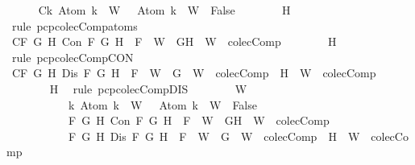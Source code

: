 \begin{isabellebody}
\ \ \ \ \isamarkupfalse%
\ C{}{\isacharcolon}{\isachardoublequoteopen}{\isasymforall}k{\isachardot}\ Atom\ k\ {\isasymin}\ W\ {\isasymlongrightarrow}\ \isactrlbold {\isasymnot}\ {\isacharparenleft}Atom\ k{\isacharparenright}\ {\isasymin}\ W\ {\isasymlongrightarrow}\ False{\isachardoublequoteclose}\isanewline
\ \ \ \ \ \ \isamarkupfalse%
\ H\ \isamarkupfalse%
\ {\isacharparenleft}rule\ pcp{\isacharunderscore}colecComp{\isacharunderscore}atoms{\isacharparenright}\isanewline
\ \ \ \ \isamarkupfalse%
\ C{}{\isacharcolon}{\isachardoublequoteopen}{\isasymforall}F\ G\ H{\isachardot}\ Con\ F\ G\ H\ {\isasymlongrightarrow}\ F\ {\isasymin}\ W\ {\isasymlongrightarrow}\ {\isacharbraceleft}G{\isacharcomma}H{\isacharbraceright}\ {\isasymunion}\ W\ {\isasymin}\ colecComp{\isachardoublequoteclose}\isanewline
\ \ \ \ \ \ \isamarkupfalse%
\ H\ \isamarkupfalse%
\ {\isacharparenleft}rule\ pcp{\isacharunderscore}colecComp{\isacharunderscore}CON{\isacharparenright}\isanewline
\ \ \ \ \isamarkupfalse%
\ C{}{\isacharcolon}{\isachardoublequoteopen}{\isasymforall}F\ G\ H{\isachardot}\ Dis\ F\ G\ H\ {\isasymlongrightarrow}\ F\ {\isasymin}\ W\ {\isasymlongrightarrow}\ {\isacharbraceleft}G{\isacharbraceright}\ {\isasymunion}\ W\ {\isasymin}\ colecComp\ {\isasymor}\ {\isacharbraceleft}H{\isacharbraceright}\ {\isasymunion}\ W\ {\isasymin}\ colecComp{\isachardoublequoteclose}\isanewline
\ \ \ \ \ \ \isamarkupfalse%
\ H\ \isamarkupfalse%
\ {\isacharparenleft}rule\ pcp{\isacharunderscore}colecComp{\isacharunderscore}DIS{\isacharparenright}\isanewline
\ \ \ \ \isamarkupfalse%
\ {\isachardoublequoteopen}{\isasymbottom}\ {\isasymnotin}\ W\isanewline
\ \ \ \ \ \ \ \ \ \ {\isasymand}\ {\isacharparenleft}{\isasymforall}k{\isachardot}\ Atom\ k\ {\isasymin}\ W\ {\isasymlongrightarrow}\ \isactrlbold {\isasymnot}\ {\isacharparenleft}Atom\ k{\isacharparenright}\ {\isasymin}\ W\ {\isasymlongrightarrow}\ False{\isacharparenright}\isanewline
\ \ \ \ \ \ \ \ \ \ {\isasymand}\ {\isacharparenleft}{\isasymforall}F\ G\ H{\isachardot}\ Con\ F\ G\ H\ {\isasymlongrightarrow}\ F\ {\isasymin}\ W\ {\isasymlongrightarrow}\ {\isacharbraceleft}G{\isacharcomma}H{\isacharbraceright}\ {\isasymunion}\ W\ {\isasymin}\ colecComp{\isacharparenright}\isanewline
\ \ \ \ \ \ \ \ \ \ {\isasymand}\ {\isacharparenleft}{\isasymforall}F\ G\ H{\isachardot}\ Dis\ F\ G\ H\ {\isasymlongrightarrow}\ F\ {\isasymin}\ W\ {\isasymlongrightarrow}\ {\isacharbraceleft}G{\isacharbraceright}\ {\isasymunion}\ W\ {\isasymin}\ colecComp\ {\isasymor}\ {\isacharbraceleft}H{\isacharbraceright}\ {\isasymunion}\ W\ {\isasymin}\ colecComp{\isacharparenright}{\isachardoublequoteclose}\isanewline

\end{isabellebody}
